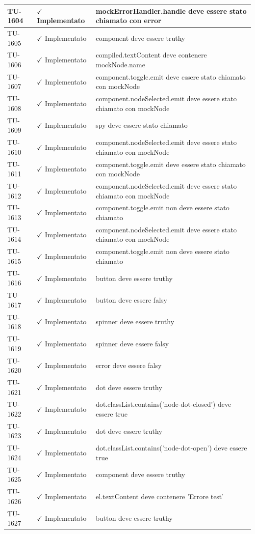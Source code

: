 ﻿\documentclass[a4paper,12pt]{article}
\newcommand{\ok}{\textcolor{green!60!black}{$\checkmark$ Implementato}}
\begin{document}
\begin{longtable}{|p{2cm}|p{3.5cm}|p{9.5cm}|}
\hline
TU-1604 & \ok & mockErrorHandler.handle deve essere stato chiamato con error \\
\hline
TU-1605 & \ok & component deve essere truthy \\
\hline
TU-1606 & \ok & compiled.textContent deve contenere mockNode.name \\
\hline
TU-1607 & \ok & component.toggle.emit deve essere stato chiamato con mockNode \\
\hline
TU-1608 & \ok & component.nodeSelected.emit deve essere stato chiamato con mockNode \\
\hline
TU-1609 & \ok & spy deve essere stato chiamato \\
\hline
TU-1610 & \ok & component.nodeSelected.emit deve essere stato chiamato con mockNode \\
\hline
TU-1611 & \ok & component.toggle.emit deve essere stato chiamato con mockNode \\
\hline
TU-1612 & \ok & component.nodeSelected.emit deve essere stato chiamato con mockNode \\
\hline
TU-1613 & \ok & component.toggle.emit non deve essere stato chiamato \\
\hline
TU-1614 & \ok & component.nodeSelected.emit deve essere stato chiamato con mockNode \\
\hline
TU-1615 & \ok & component.toggle.emit non deve essere stato chiamato \\
\hline
TU-1616 & \ok & button deve essere truthy \\
\hline
TU-1617 & \ok & button deve essere falsy \\
\hline
TU-1618 & \ok & spinner deve essere truthy \\
\hline
TU-1619 & \ok & spinner deve essere falsy \\
\hline
TU-1620 & \ok & error deve essere falsy \\
\hline
TU-1621 & \ok & dot deve essere truthy \\
\hline
TU-1622 & \ok & dot.classList.contains('node-dot-closed') deve essere true \\
\hline
TU-1623 & \ok & dot deve essere truthy \\
\hline
TU-1624 & \ok & dot.classList.contains('node-dot-open') deve essere true \\
\hline
TU-1625 & \ok & component deve essere truthy \\
\hline
TU-1626 & \ok & el.textContent deve contenere 'Errore test' \\
\hline
TU-1627 & \ok & button deve essere truthy \\

\end{longtable}
\end{document}

